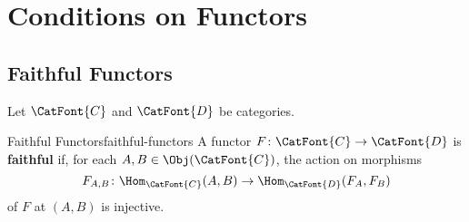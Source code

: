 \section{Conditions on Functors}\label{section-conditions-on-functors}
\subsection{Faithful Functors}\label{subsection-faithful-functors}
Let $\CatFont{C}$ and $\CatFont{D}$ be categories.
\begin{definition}{Faithful Functors}{faithful-functors}%
    A functor $F\colon\CatFont{C}\to\CatFont{D}$ is \textbf{faithful} if, for each $A,B\in\Obj(\CatFont{C})$, the action on morphisms
    \[
        F_{A,B}
        \colon
        \Hom_{\CatFont{C}}(A,B)
        \to
        \Hom_{\CatFont{D}}(F_{A},F_{B})
    \]%
    of $F$ at $(A,B)$ is injective.
\end{definition}
